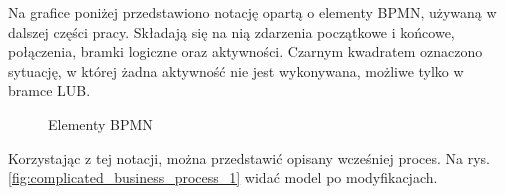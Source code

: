 Na grafice poniżej przedstawiono notację opartą o elementy BPMN, używaną w dalszej części pracy. Składają się na nią zdarzenia początkowe i końcowe, połączenia, bramki logiczne oraz aktywności. Czarnym kwadratem oznaczono sytuację, w której żadna aktywność nie jest wykonywana, możliwe tylko w bramce LUB. 
\clearpage
\begin{figure}[h]
	\caption{\label{fig:bpmn_example}Elementy BPMN}
	\label{fig:lifecycle}
\end{figure}

Korzystając z tej notacji, można przedstawić opisany wcześniej proces. Na rys.  \ref{fig:complicated_business_process_1} widać model po modyfikacjach. 

